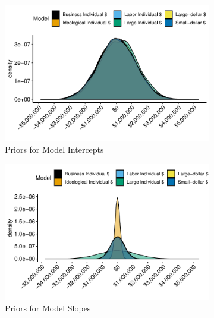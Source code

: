 \documentclass[12pt]{article}
\begin{document}
\begin{appendices}
\begin{figure}[!htb]
    \centering
    \begin{subfigure}[b]{0.45\textwidth}
        \centering
        \includegraphics[width=\linewidth]{indiv_int.pdf}
        \caption{Priors for Model Intercepts}
    \end{subfigure}
    \begin{subfigure}[b]{0.45\textwidth}
        \centering
        \includegraphics[width=\linewidth]{indiv_slopes.pdf}
        \caption{Priors for Model Slopes}
    \end{subfigure}
    \begin{subfigure}[b]{0.45\textwidth}
    	\centering

\end{subfigure}
\end{figure}
\end{appendices}
\end{document}
